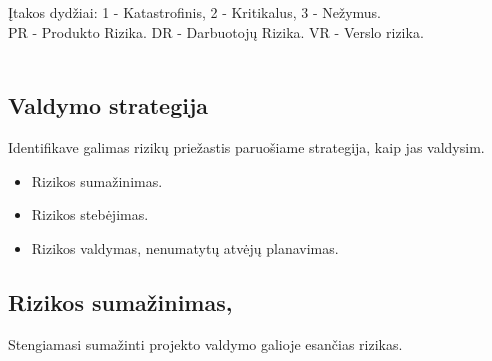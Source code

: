 \documentclass[a4paper,12pt]{article}
\begin{document}
	\\\\ \k Itakos dydžiai: 
		1 - Katastrofinis,
		2 - Kritikalus,
		3 - Ne\v zymus.\\
		PR - Produkto Rizika. DR - Darbuotoj\k u Rizika. VR - Verslo rizika. \\\\
	
\subsection{Valdymo strategija}
Identifikave galimas rizik\k u prie\v zastis paruo\v siame strategija, kaip jas valdysim.
\begin{itemize}
  \item Rizikos suma\v zinimas.
  \item Rizikos steb\. ejimas.
  \item Rizikos valdymas, nenumatyt\k u atv\. ej\k u planavimas.
\end{itemize}

\newpage

\subsection{Rizikos suma\v zinimas, }
Stengiamasi suma\v zinti projekto valdymo galioje esan\v cias rizikas.
\end{document}
